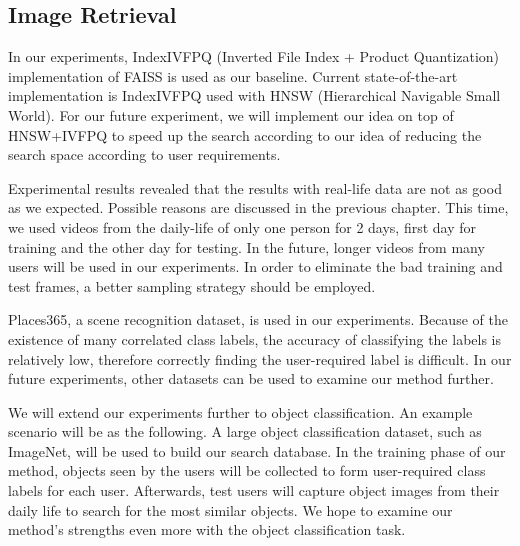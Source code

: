\subsection*{Image Retrieval}

In our experiments, IndexIVFPQ (Inverted File Index + Product Quantization) implementation of FAISS is used as our baseline. 
Current state-of-the-art implementation is IndexIVFPQ used with HNSW (Hierarchical Navigable Small World). 
For our future experiment, we will implement our idea on top of HNSW+IVFPQ to speed up the search according to our idea of reducing the search space according to user requirements.

Experimental results revealed that the results with real-life data are not as good as we expected. 
Possible reasons are discussed in the previous chapter. 
This time, we used videos from the daily-life of only one person for 2 days, first day for training and the other day for testing. 
In the future, longer videos from many users will be used in our experiments.
In order to eliminate the bad training and test frames, a better sampling strategy should be employed.

Places365, a scene recognition dataset, is used in our experiments. 
Because of the existence of many correlated class labels, the accuracy of classifying the labels is relatively low, therefore correctly finding the user-required label is difficult. 
In our future experiments, other datasets can be used to examine our method further. 

We will extend our experiments further to object classification. 
An example scenario will be as the following.
A large object classification dataset, such as ImageNet, will be used to build our search database.
In the training phase of our method, objects seen by the users will be collected to form user-required class labels for each user. 
Afterwards, test users will capture object images from their daily life to search for the most similar objects. 
We hope to examine our method's strengths even more with the object classification task.


